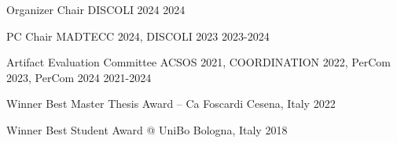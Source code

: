 
\begin{cvhonors}

  \cvhonor
    {Organizer Chair} %
    {DISCOLI 2024} %
    {} %
    {2024} %

  \cvhonor
    {PC Chair} %
    {MADTECC 2024, DISCOLI 2023} %
    {} %
    {2023-2024} %

  \cvhonor
    {Artifact Evaluation Committee} %
    {ACSOS 2021, COORDINATION 2022, PerCom 2023, PerCom 2024} %
    {} %
    {2021-2024} %

\end{cvhonors}


\begin{cvhonors}

\cvhonor
    {Winner} %
    {Best Master Thesis Award -- Ca Foscardi} %
    {Cesena, Italy} %
    {2022} %

\cvhonor
    {Winner}
    {Best Student Award @ UniBo}
    {Bologna, Italy}
    {2018}
\end{cvhonors}